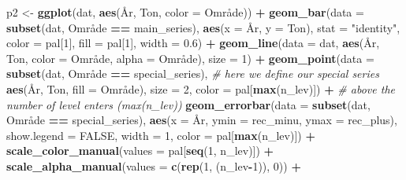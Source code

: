 \documentclass[]{article}
\newenvironment{Shaded}{\begin{snugshade}}{\end{snugshade}}
\newcommand{\KeywordTok}[1]{\textcolor[rgb]{0.13,0.29,0.53}{\textbf{#1}}}
\newcommand{\DataTypeTok}[1]{\textcolor[rgb]{0.13,0.29,0.53}{#1}}
\newcommand{\DecValTok}[1]{\textcolor[rgb]{0.00,0.00,0.81}{#1}}
\newcommand{\FloatTok}[1]{\textcolor[rgb]{0.00,0.00,0.81}{#1}}
\newcommand{\StringTok}[1]{\textcolor[rgb]{0.31,0.60,0.02}{#1}}
\newcommand{\CommentTok}[1]{\textcolor[rgb]{0.56,0.35,0.01}{\textit{#1}}}
\newcommand{\OtherTok}[1]{\textcolor[rgb]{0.56,0.35,0.01}{#1}}
\newcommand{\OperatorTok}[1]{\textcolor[rgb]{0.81,0.36,0.00}{\textbf{#1}}}
\newcommand{\NormalTok}[1]{#1}
\begin{document}
\begin{Shaded}
\begin{Highlighting}[]
\NormalTok{p2 <-}\StringTok{ }\KeywordTok{ggplot}\NormalTok{(dat, }\KeywordTok{aes}\NormalTok{(År, Ton, }\DataTypeTok{color =}\NormalTok{ Område)) }\OperatorTok{+}
\StringTok{  }\KeywordTok{geom_bar}\NormalTok{(}\DataTypeTok{data =} \KeywordTok{subset}\NormalTok{(dat, Område }\OperatorTok{==}\StringTok{ }\NormalTok{main_series), }
           \KeywordTok{aes}\NormalTok{(}\DataTypeTok{x =}\NormalTok{ År, }\DataTypeTok{y =}\NormalTok{ Ton), }\DataTypeTok{stat =} \StringTok{"identity"}\NormalTok{, }\DataTypeTok{color =}\NormalTok{ pal[}\DecValTok{1}\NormalTok{], }\DataTypeTok{fill =}\NormalTok{ pal[}\DecValTok{1}\NormalTok{], }
           \DataTypeTok{width =} \FloatTok{0.6}\NormalTok{) }\OperatorTok{+}
\StringTok{  }\KeywordTok{geom_line}\NormalTok{(}\DataTypeTok{data =}\NormalTok{ dat, }\KeywordTok{aes}\NormalTok{(År, Ton, }\DataTypeTok{color =}\NormalTok{ Område, }\DataTypeTok{alpha =}\NormalTok{ Område), }
            \DataTypeTok{size =} \DecValTok{1}\NormalTok{) }\OperatorTok{+}\StringTok{ }
\StringTok{  }\KeywordTok{geom_point}\NormalTok{(}\DataTypeTok{data =} \KeywordTok{subset}\NormalTok{(dat, Område }\OperatorTok{==}\StringTok{ }\NormalTok{special_series), }\CommentTok{# here we define our special series}
             \KeywordTok{aes}\NormalTok{(År, Ton, }\DataTypeTok{fill =}\NormalTok{ Område), }\DataTypeTok{size =} \DecValTok{2}\NormalTok{, }\DataTypeTok{color =}\NormalTok{ pal[}\KeywordTok{max}\NormalTok{(n_lev)]) }\OperatorTok{+}\StringTok{ }
\StringTok{  }\CommentTok{# above the number of level enters (max(n_lev))}
\StringTok{  }\KeywordTok{geom_errorbar}\NormalTok{(}\DataTypeTok{data =} \KeywordTok{subset}\NormalTok{(dat, Område }\OperatorTok{==}\StringTok{ }\NormalTok{special_series), }
                \KeywordTok{aes}\NormalTok{(}\DataTypeTok{x =}\NormalTok{ År, }\DataTypeTok{ymin =}\NormalTok{ rec_minu, }\DataTypeTok{ymax =}\NormalTok{ rec_plus), }
                \DataTypeTok{show.legend =} \OtherTok{FALSE}\NormalTok{, }\DataTypeTok{width  =} \DecValTok{1}\NormalTok{, }\DataTypeTok{color =}\NormalTok{ pal[}\KeywordTok{max}\NormalTok{(n_lev)]) }\OperatorTok{+}
\StringTok{  }\KeywordTok{scale_color_manual}\NormalTok{(}\DataTypeTok{values =}\NormalTok{ pal[}\KeywordTok{seq}\NormalTok{(}\DecValTok{1}\NormalTok{, n_lev)]) }\OperatorTok{+}
\StringTok{  }\KeywordTok{scale_alpha_manual}\NormalTok{(}\DataTypeTok{values =} \KeywordTok{c}\NormalTok{(}\KeywordTok{rep}\NormalTok{(}\DecValTok{1}\NormalTok{, (n_lev}\OperatorTok{-}\DecValTok{1}\NormalTok{)), }\DecValTok{0}\NormalTok{)) }\OperatorTok{+}\StringTok{ }

\end{Highlighting}
\end{Shaded}
\end{document}
